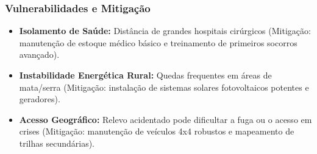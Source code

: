 \subsubsection{Vulnerabilidades e
Mitigação}

\begin{itemize}
\tightlist
\item
  \textbf{Isolamento de Saúde:} Distância de grandes hospitais
  cirúrgicos (Mitigação: manutenção de estoque médico básico e
  treinamento de primeiros socorros avançado).
\item
  \textbf{Instabilidade Energética Rural:} Quedas frequentes em áreas de
  mata/\allowbreak serra (Mitigação: instalação de sistemas solares fotovoltaicos
  potentes e geradores).
\item
  \textbf{Acesso Geográfico:} Relevo acidentado pode dificultar a fuga
  ou o acesso em crises (Mitigação: manutenção de veículos 4x4 robustos
  e mapeamento de trilhas secundárias).
\end{itemize}

